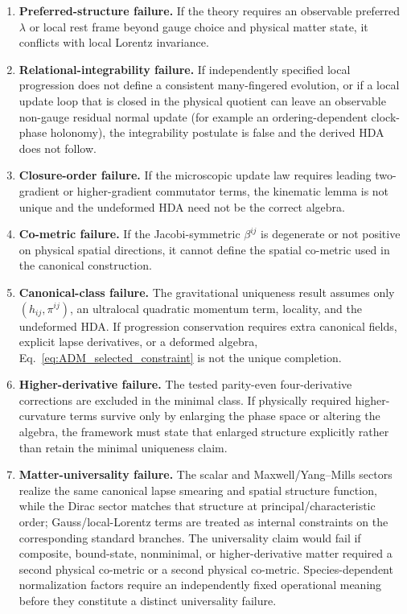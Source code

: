 \documentclass[11pt]{article}
\begin{document}
\begin{enumerate}[label=(\roman*)]
    \item \textbf{Preferred-structure failure.} If the theory requires an observable preferred $\lambda$ or local rest frame beyond gauge choice and physical matter state, it conflicts with local Lorentz invariance.

    \item \textbf{Relational-integrability failure.} If independently specified local progression does not define a consistent many-fingered evolution, or if a local update loop that is closed in the physical quotient can leave an observable non-gauge residual normal update (for example an ordering-dependent clock-phase holonomy), the integrability postulate is false and the derived HDA does not follow.

    \item \textbf{Closure-order failure.} If the microscopic update law requires leading two-gradient or higher-gradient commutator terms, the kinematic lemma is not unique and the undeformed HDA need not be the correct algebra.

    \item \textbf{Co-metric failure.} If the Jacobi-symmetric $\beta^{ij}$ is degenerate or not positive on physical spatial directions, it cannot define the spatial co-metric used in the canonical construction.

    \item \textbf{Canonical-class failure.} The gravitational uniqueness result assumes only $(h_{ij},\pi^{ij})$, an ultralocal quadratic momentum term, locality, and the undeformed HDA. If progression conservation requires extra canonical fields, explicit lapse derivatives, or a deformed algebra, Eq.~\eqref{eq:ADM_selected_constraint} is not the unique completion.

    \item \textbf{Higher-derivative failure.} The tested parity-even four-derivative corrections are excluded in the minimal class. If physically required higher-curvature terms survive only by enlarging the phase space or altering the algebra, the framework must state that enlarged structure explicitly rather than retain the minimal uniqueness claim.

    \item \textbf{Matter-universality failure.} The scalar and Maxwell/Yang--Mills sectors realize the same canonical lapse smearing and spatial structure function, while the Dirac sector matches that structure at principal/characteristic order; Gauss/local-Lorentz terms are treated as internal constraints on the corresponding standard branches. The universality claim would fail if composite, bound-state, nonminimal, or higher-derivative matter required a second physical co-metric or a second physical co-metric. Species-dependent normalization factors require an independently fixed operational meaning before they constitute a distinct universality failure.


\end{enumerate}
\end{document}
